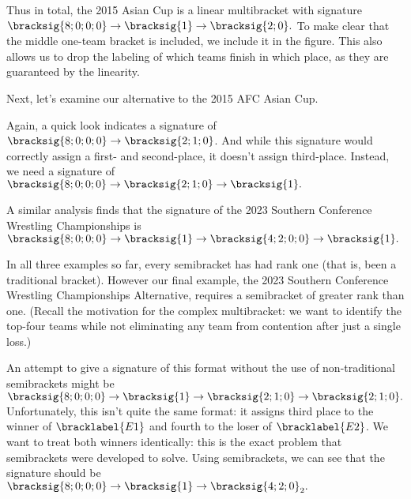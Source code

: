 {    Thus in total, the 2015 Asian Cup is a linear multibracket with signature $\bracksig{8;0;0;0} \to \bracksig{1} \to \bracksig{2;0}.$ To make clear that the middle one-team bracket is included, we include it in the figure. This also allows us to drop the labeling of which teams finish in which place, as they are guaranteed by the linearity.


    Next, let's examine our alternative to the 2015 AFC Asian Cup.


    Again, a quick look indicates a signature of $\bracksig{8;0;0;0} \to \bracksig{2;1;0}$. And while this signature would correctly assign a first- and second-place, it doesn't assign third-place. Instead, we need a signature of $\bracksig{8;0;0;0} \to \bracksig{2;1;0} \to \bracksig{1}.$


    A similar analysis finds that the signature of the 2023 Southern Conference Wrestling Championships \cite{wiki_socon} is $\bracksig{8;0;0;0} \to \bracksig{1} \to \bracksig{4;2;0;0} \to \bracksig{1}.$


    In all three examples so far, every semibracket has had rank one (that is, been a traditional bracket). However our final example, the 2023 Southern Conference Wrestling Championships Alternative, requires a semibracket of greater rank than one. (Recall the motivation for the complex multibracket: we want to identify the top-four teams while not eliminating any team from contention after just a single loss.)


    An attempt to give a signature of this format without the use of non-traditional semibrackets might be $\bracksig{8;0;0;0} \to \bracksig{1} \to \bracksig{2;1;0} \to \bracksig{2;1;0}.$ Unfortunately, this isn't quite the same format: it assigns third place to the winner of $\bracklabel{E1}$ and fourth to the loser of $\bracklabel{E2}$. We want to treat both winners identically: this is the exact problem that semibrackets were developed to solve. Using semibrackets, we can see that the signature should be $\bracksig{8;0;0;0} \to \bracksig{1} \to \bracksig{4;2;0}_2.$

}
